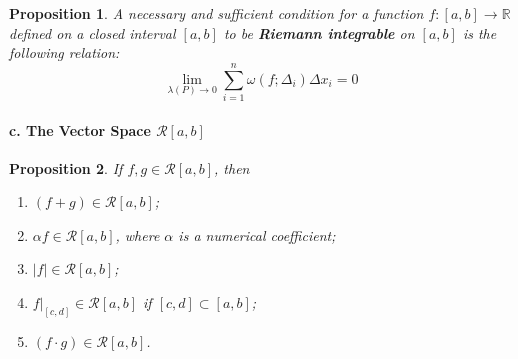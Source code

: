 \documentclass[a4paper,12pt]{article} %
\newtheorem{proposition}{Proposition}[section]
\begin{document}
\begin{proposition}
    \normalfont 
    A necessary and sufficient condition for a function $f:
    [a,b] \to \mathbb{R}$ defined on a closed interval $[a,b]$ to 
    be \textbf{Riemann integrable} on $[a,b]$ is the following relation:
    \begin{equation}
        \lim_{\lambda(P) \to 0}\sum_{i=1}^n\omega(f;\Delta_i)\Delta x_i = 0
    \end{equation}
\end{proposition}

\paragraph{\rm \textbf{c. The Vector Space $\mathcal{R}[a,b]$}}
\begin{proposition}
    \normalfont
    If $f,g\in \mathcal{R}[a,b]$, then 
    \begin{enumerate}
        \item $(f+g) \in \mathcal{R}[a,b]$;
        \item $\alpha f \in \mathcal{R}[a,b]$, where $\alpha$ is a numerical coefficient;
        \item $\vert f \vert\in \mathcal{R}[a,b] $;
        \item $f\vert_{[c,d]} \in \mathcal{R}[a,b]$ if $[c,d] \subset [a,b]$;
        \item $(f\cdot g) \in \mathcal{R}[a,b]$.
    \end{enumerate}
\end{proposition}
\end{document}
